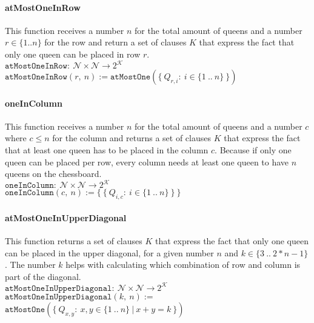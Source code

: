 \paragraph{atMostOneInRow}
This function receives a number $n$ for the total amount of queens and a number $r \in \{1 .. n\}$ for the row and return a set of clauses $K$ that express the fact that only one queen can be placed in row $r$.
\\[0.2cm]
\hspace*{1.3cm} $\texttt{atMostOneInRow}:\ \mathcal{N} \times \mathcal{N} \to 2^{\mathcal{K}}$
\\[0.2cm]
\hspace*{1.3cm} $\texttt{atMostOneInRow}(r,\ n) := \texttt{atMostOne}(\{\ Q_{r,i} :\ i \in \{1\ ..\ n\}\ \})$

\paragraph{oneInColumn}
This function receives a number $n$ for the total amount of queens and a number $c$ where $c \leq n$ for the column and returns a set of clauses $K$ that express the fact that at least one queen has to be placed in the column $c$. Because if only one queen can be placed per row, every column needs at least one queen to have $n$ queens on the chessboard.
\\[0.2cm]
\hspace*{1.3cm} $\texttt{oneInColumn}:\ \mathcal{N} \times \mathcal{N} \to 2^{\mathcal{K}}$
\\[0.2cm]
\hspace*{1.3cm} $\texttt{oneInColumn}(c,\ n) := \{\ \{\ Q_{i,c} :\ i \in \{1\ ..\ n\}\ \}\ \}$

\paragraph{atMostOneInUpperDiagonal}
This function returns a set of clauses $K$ that express the fact that only one queen can be placed in the upper diagonal, for a given number $n$ and $k \in \{3\ ..\ 2 * n - 1\}$. The number $k$ helps with calculating which combination of row and column is part of the diagonal.
\\[0.2cm]
\hspace*{1.3cm} $\texttt{atMostOneInUpperDiagonal}:\ \mathcal{N} \times \mathcal{N} \to 2^{\mathcal{K}}$
\\[0.2cm]
\hspace*{1.3cm} $\texttt{atMostOneInUpperDiagonal}(k,\ n) :=$
\\
\hspace*{2.6cm} $\texttt{atMostOne}(\{\ Q_{x,y} :\ x,y \in \{1\ ..\ n\}\ |\ x + y = k\ \})$

